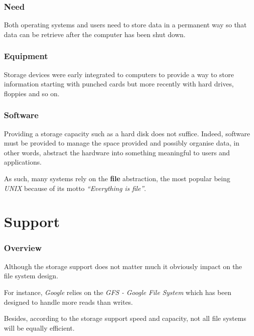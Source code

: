
\begin{frame}
  \frametitle{Need}

  Both operating systems and users need to store data in a permanent way
  \ie{} so that data can be retrieve after the computer has been shut down.
\end{frame}


\begin{frame}
  \frametitle{Equipment}

  Storage devices were early integrated to computers to provide a way
  to store information starting with punched cards but more recently with
  hard drives, floppies and so on.
\end{frame}


\begin{frame}
  \frametitle{Software}

  Providing a storage capacity such as a hard disk does not suffice. Indeed,
  software must be provided to manage the space provided and possibly organise
  data, in other words, abstract the hardware into something meaningful to
  users and applications.

  \-

  As such, many systems rely on the \textbf{file} abstraction, the most popular
  being \textit{UNIX} because of its motto \textit{``Everything is file''}.
\end{frame}

%
%

\section{Support}


\begin{frame}
  \frametitle{Overview}

  Although the storage support does not matter much it obviously impact on
  the file system design.

  \-

  For instance, \textit{Google} relies on the \textit{GFS - Google File System}
  which has been designed to handle more reads than writes.

  \-

  Besides, according to the storage support speed and capacity, not all
  file systems will be equally efficient.
\end{frame}

